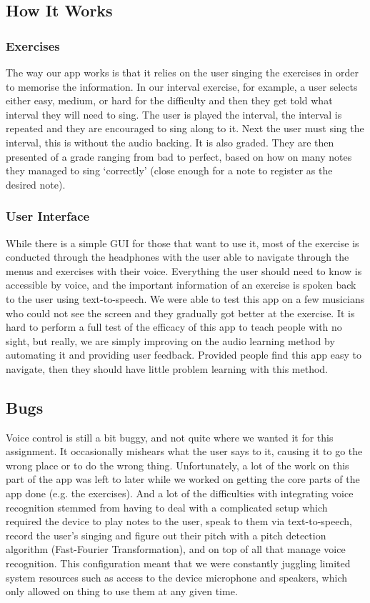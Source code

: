 \documentclass[10pt,a4paper]{article}
\begin{document}
\subsection{How It Works}
\subsubsection{Exercises}
The way our app works is that it relies on the user singing the exercises in order to memorise the information. In our interval exercise, for example, a user selects either easy, medium, or hard for the difficulty and then they get told what interval they will need to sing. The user is played the interval, the interval is repeated and they are encouraged to sing along to it. Next the user must sing the interval, this is without the audio backing. It is also graded. They are then presented of a grade ranging from bad to perfect, based on how on many notes they managed to sing ‘correctly’ (close enough for a note to register as the desired note).
\subsubsection{User Interface}
While there is a simple GUI for those that want to use it, most of the exercise is conducted through the headphones with the user able to navigate through the menus and exercises with their voice.  Everything the user should need to know is accessible by voice, and the important information of an exercise is spoken back to the user using text-to-speech. We were able to test this app on a few musicians who could not see the screen and they gradually got better at the exercise. It is hard to perform a full test of the efficacy of this app to teach people with no sight, but really, we are simply improving on the audio learning method by automating it and providing user feedback. Provided people find this app easy to navigate, then they should have little problem learning with this method.

\subsection{Bugs}
Voice control is still a bit buggy, and not quite where we wanted it for this assignment. It occasionally mishears what the user says to it, causing it to go the wrong place or to do the wrong thing. Unfortunately, a lot of the work on this part of the app was left to later while we worked on getting the core parts of the app done (e.g. the exercises). And a lot of the difficulties with integrating voice recognition stemmed from having to deal with a complicated setup which required the device to play notes to the user, speak to them via text-to-speech, record the user’s singing and figure out their pitch with a pitch detection algorithm (Fast-Fourier Transformation), and on top of all that manage voice recognition. This configuration meant that we were constantly juggling limited system resources such as access to the device microphone and speakers, which only allowed on thing to use them at any given time.
\end{document}

